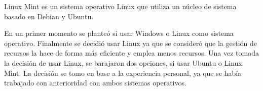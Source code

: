 Linux Mint es un sistema operativo Linux que utiliza un núcleo de sistema basado en Debian y Ubuntu.

En un primer momento se planteó si usar Windows o Linux como sistema operativo. Finalmente se decidió usar Linux ya que se consideró que la gestión de recursos la hace de forma más eficiente y emplea menos recursos. Una vez tomada la decisión de usar Linux, se barajaron dos opciones, si usar Ubuntu o Linux Mint. La decisión se tomo en base a la experiencia personal, ya que se había trabajado con anterioridad con ambos sistemas operativos.